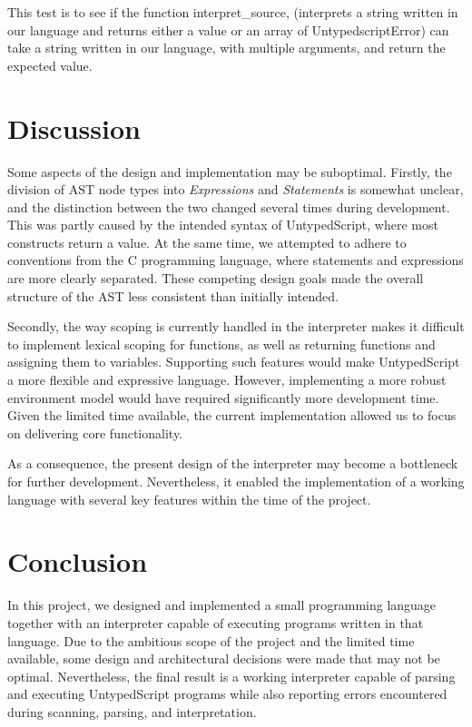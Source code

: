 \documentclass[12pt,a4paper]{article}
\begin{document}
This test is to see if the function interpret_source, (interprets a string written in our language and returns either a value or an array of UntypedscriptError) can take a string written in our language, with multiple arguments, and return the expected value.

\section{Discussion}

Some aspects of the design and implementation may be suboptimal. Firstly, the division of AST node types into \textit{Expressions} and \textit{Statements} is somewhat unclear, and the distinction between the two changed several times during development. This was partly caused by the intended syntax of UntypedScript, where most constructs return a value. At the same time, we attempted to adhere to conventions from the C programming language, where statements and expressions are more clearly separated. These competing design goals made the overall structure of the AST less consistent than initially intended.

Secondly, the way scoping is currently handled in the interpreter makes it difficult to implement lexical scoping for functions, as well as returning functions and assigning them to variables. Supporting such features would make UntypedScript a more flexible and expressive language. However, implementing a more robust environment model would have required significantly more development time. Given the limited time available, the current implementation allowed us to focus on delivering core functionality.

As a consequence, the present design of the interpreter may become a bottleneck for further development. Nevertheless, it enabled the implementation of a working language with several key features within the time of the project.

\section{Conclusion}

In this project, we designed and implemented a small programming language together with an interpreter capable of executing programs written in that language. Due to the ambitious scope of the project and the limited time available, some design and architectural decisions were made that may not be optimal. Nevertheless, the final result is a working interpreter capable of parsing and executing UntypedScript programs while also reporting errors encountered during scanning, parsing, and interpretation.
\end{document}
